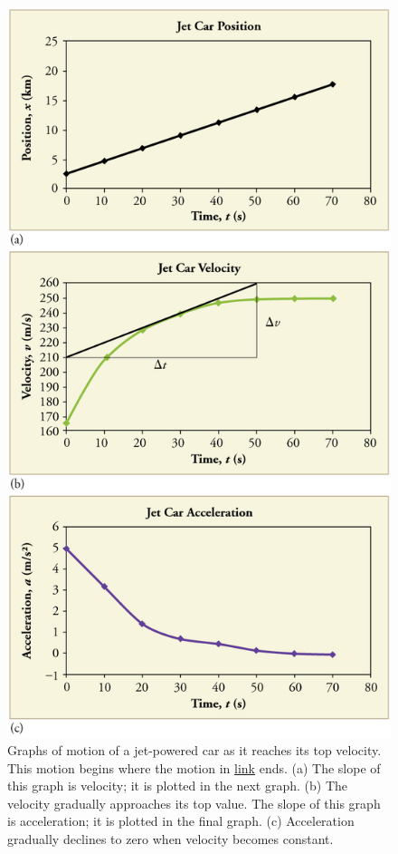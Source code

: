 \documentclass[
]{book}
\begin{document}
\begin{figure}
\hypertarget{import-auto-id1534076}{%
\centering
\includegraphics{images/Figure_02_07_04.jpg}
\caption{Graphs of motion of a jet-powered car as it reaches its top velocity.
This motion begins where the motion in
\protect\hyperlink{import-auto-id3596921}{link} ends. (a) The
slope of this graph is velocity; it is plotted in the next graph. (b)
The velocity gradually approaches its top value. The slope of this graph
is acceleration; it is plotted in the final graph. (c) Acceleration
gradually declines to zero when velocity becomes
constant.}\label{import-auto-id1534076}
}
\end{figure}
\end{document}
